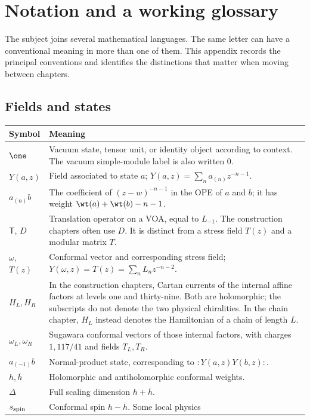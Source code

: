 \chapter{Notation and a working glossary}
\label{app:notation}

The subject joins several mathematical languages. The same letter
can have a conventional meaning in more than one of them. This
appendix records the principal conventions and identifies the
distinctions that matter when moving between chapters.

\section{Fields and states}

\begin{longtable}{p{}p{}}
\toprule Symbol&Meaning\\\midrule
\endhead
$\one$&Vacuum state, tensor unit, or identity object according to
context. The vacuum simple-module label is also written $0$.\\
$Y(a,z)$&Field associated to state $a$;
$Y(a,z)=\sum_n a_{(n)}z^{-n-1}$.\\
$a_{(n)}b$&The coefficient of $(z-w)^{-n-1}$ in the OPE of $a$
and $b$; it has weight $\wt(a)+\wt(b)-n-1$.\\
$\mathsf T$, $D$&Translation operator on a VOA, equal to $L_{-1}$.
The construction chapters often use $D$.
It is distinct from a stress field $T(z)$ and a modular matrix $T$.\\
$\omega$, $T(z)$&Conformal vector and corresponding stress field;
$Y(\omega,z)=T(z)=\sum_nL_nz^{-n-2}$.\\
$H_L,H_R$&In the construction chapters, Cartan currents of the internal affine factors at
levels one and thirty-nine. Both are holomorphic; the subscripts
do not denote the two physical chiralities. In the chain chapter,
$H_L$ instead denotes the Hamiltonian of a chain of length $L$.\\
$\omega_L,\omega_R$&Sugawara conformal vectors of those internal
factors, with charges $1,117/41$ and fields $T_L,T_R$.\\
$a_{(-1)}b$&Normal-product state, corresponding to
$:Y(a,z)Y(b,z):$.\\
$h,\bar h$&Holomorphic and antiholomorphic conformal weights.\\
$\Delta$&Full scaling dimension $h+\bar h$.\\
$s_{\rm spin}$&Conformal spin $h-\bar h$. Some local physics

\end{longtable}
